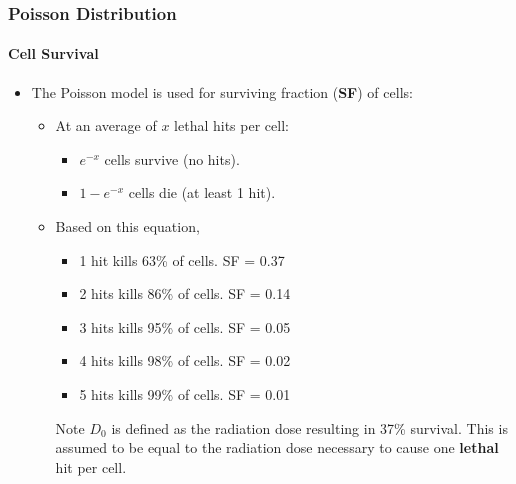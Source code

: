 \documentclass{beamer}
\begin{document}
\begin{frame}
  \frametitle{Poisson Distribution}
  \framesubtitle{Cell Survival}
  \begin{itemize}
    \item The Poisson model is used for surviving fraction (\textbf{SF}) of cells:
    \begin{itemize}
      \item At an average of $x$ lethal hits per cell:
        \begin{itemize}
          \item $e^{-x}$ cells survive (no hits).
          \item $1 - e^{-x}$ cells die (at least 1 hit).
        \end{itemize}
      \item Based on this equation,
        \begin{itemize}
          \item 1 hit kills 63\% of cells. SF = 0.37
          \item 2 hits kills 86\% of cells. SF = 0.14
          \item 3 hits kills 95\% of cells. SF = 0.05
          \item 4 hits kills 98\% of cells. SF = 0.02
          \item 5 hits kills 99\% of cells. SF = 0.01
        \end{itemize}
        \begin{block}{Note}
          $D_0$ is defined as the radiation dose resulting in 37\% survival. This is assumed  to be equal to the radiation dose necessary to cause one \textbf{lethal} hit per cell.
        \end{block}
    \end{itemize}
  \end{itemize}
\end{frame}
\end{document}
